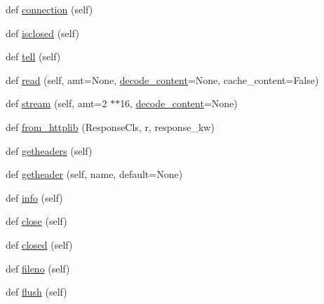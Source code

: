 \begin{DoxyCompactItemize}
\item 
def \hyperlink{classpip_1_1__vendor_1_1urllib3_1_1response_1_1HTTPResponse_a27a88449c366048b39e0a46f78381f1a}{connection} (self)
\item 
def \hyperlink{classpip_1_1__vendor_1_1urllib3_1_1response_1_1HTTPResponse_a440662f1b8fc0e14472da84b1f8e6145}{isclosed} (self)
\item 
def \hyperlink{classpip_1_1__vendor_1_1urllib3_1_1response_1_1HTTPResponse_aad1e9c42472d7ccf472e09e54b268bc4}{tell} (self)
\item 
def \hyperlink{classpip_1_1__vendor_1_1urllib3_1_1response_1_1HTTPResponse_aeec42779d7171f33bcb5d0ffbd77c1c4}{read} (self, amt=None, \hyperlink{classpip_1_1__vendor_1_1urllib3_1_1response_1_1HTTPResponse_a549e8dc33482f73e462d07d9816ab257}{decode\+\_\+content}=None, cache\+\_\+content=False)
\item 
def \hyperlink{classpip_1_1__vendor_1_1urllib3_1_1response_1_1HTTPResponse_aad7ca8755c86a2cfe56f28e64b7f9e77}{stream} (self, amt=2 $\ast$$\ast$16, \hyperlink{classpip_1_1__vendor_1_1urllib3_1_1response_1_1HTTPResponse_a549e8dc33482f73e462d07d9816ab257}{decode\+\_\+content}=None)
\item 
def \hyperlink{classpip_1_1__vendor_1_1urllib3_1_1response_1_1HTTPResponse_a71d17e7a4784c36f41fb5a56ad97cb1c}{from\+\_\+httplib} (Response\+Cls, r, response\+\_\+kw)
\item 
def \hyperlink{classpip_1_1__vendor_1_1urllib3_1_1response_1_1HTTPResponse_a2988265791b822a0c51822a386b4e0e5}{getheaders} (self)
\item 
def \hyperlink{classpip_1_1__vendor_1_1urllib3_1_1response_1_1HTTPResponse_a6cbff693e6d90bfdeaae74fcf4eb962b}{getheader} (self, name, default=None)
\item 
def \hyperlink{classpip_1_1__vendor_1_1urllib3_1_1response_1_1HTTPResponse_a97d4f566d75515e4ba549aca353b3570}{info} (self)
\item 
def \hyperlink{classpip_1_1__vendor_1_1urllib3_1_1response_1_1HTTPResponse_a502c515ca3ec9b38232d65e15a566e17}{close} (self)
\item 
def \hyperlink{classpip_1_1__vendor_1_1urllib3_1_1response_1_1HTTPResponse_a0d284ed4e05cc604f96639e3f1d02048}{closed} (self)
\item 
def \hyperlink{classpip_1_1__vendor_1_1urllib3_1_1response_1_1HTTPResponse_af1f91efd61c7e9a67bff42b3ee3ac8f5}{fileno} (self)
\item 
def \hyperlink{classpip_1_1__vendor_1_1urllib3_1_1response_1_1HTTPResponse_a7db24b67e4bc1d73675bbe6c7643f49a}{flush} (self)
$$
\end{DoxyCompactItemize}
